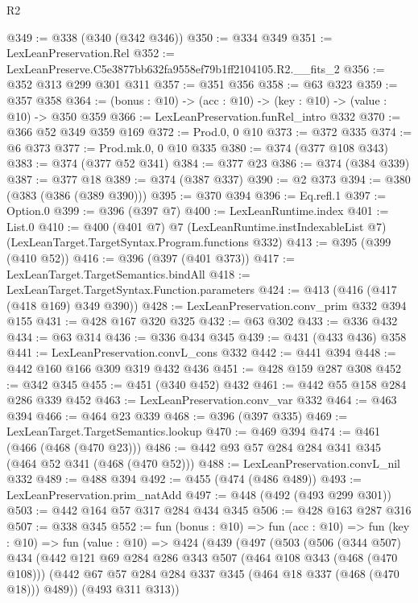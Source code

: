 \begin{lexlean}{R2}
\begin{coremodule}
@349 := @338 (@340 (@342 @346))
@350 := @334 @349
@351 := LexLeanPreservation.Rel
@352 := LexLeanPreserve.C5e3877bb632fa9558ef79b1ff2104105.R2.__fits_2
@356 := @352 @313 @299 @301 @311
@357 := @351 @356
@358 := @63 @323
@359 := @357 @358
@364 := (bonus : @10) -> (acc : @10) -> (key : @10) -> (value : @10) -> @350 @359
@366 := LexLeanPreservation.funRel_intro @332
@370 := @366 @52 @349 @359 @169
@372 := Prod.{0, 0} @10
@373 := @372 @335
@374 := @6 @373
@377 := Prod.mk.{0, 0} @10 @335
@380 := @374 (@377 @108 @343)
@383 := @374 (@377 @52 @341)
@384 := @377 @23
@386 := @374 (@384 @339)
@387 := @377 @18
@389 := @374 (@387 @337)
@390 := @2 @373
@394 := @380 (@383 (@386 (@389 @390)))
@395 := @370 @394
@396 := Eq.refl.{1}
@397 := Option.{0}
@399 := @396 (@397 @7)
@400 := LexLeanRuntime.index
@401 := List.{0}
@410 := @400
    (@401 @7)
    @7
    (LexLeanRuntime.instIndexableList @7)
    (LexLeanTarget.TargetSyntax.Program.functions @332)
@413 := @395 (@399 (@410 @52))
@416 := @396 (@397 (@401 @373))
@417 := LexLeanTarget.TargetSemantics.bindAll
@418 := LexLeanTarget.TargetSyntax.Function.parameters
@424 := @413 (@416 (@417 (@418 @169) @349 @390))
@428 := LexLeanPreservation.conv_prim @332 @394 @155
@431 := @428 @167 @320 @325
@432 := @63 @302
@433 := @336 @432
@434 := @63 @314
@436 := @336 @434 @345
@439 := @431 (@433 @436) @358
@441 := LexLeanPreservation.convL_cons @332
@442 := @441 @394
@448 := @442 @160 @166 @309 @319 @432 @436
@451 := @428 @159 @287 @308
@452 := @342 @345
@455 := @451 (@340 @452) @432
@461 := @442 @55 @158 @284 @286 @339 @452
@463 := LexLeanPreservation.conv_var @332
@464 := @463 @394
@466 := @464 @23 @339
@468 := @396 (@397 @335)
@469 := LexLeanTarget.TargetSemantics.lookup
@470 := @469 @394
@474 := @461 (@466 (@468 (@470 @23)))
@486 := @442 @93 @57 @284 @284 @341 @345 (@464 @52 @341 (@468 (@470 @52)))
@488 := LexLeanPreservation.convL_nil @332
@489 := @488 @394
@492 := @455 (@474 (@486 @489))
@493 := LexLeanPreservation.prim_natAdd
@497 := @448 (@492 (@493 @299 @301))
@503 := @442 @164 @57 @317 @284 @434 @345
@506 := @428 @163 @287 @316
@507 := @338 @345
@552 := fun (bonus : @10) =>
  fun (acc : @10) =>
  fun (key : @10) =>
  fun (value : @10) =>
  @424
    (@439
      (@497
        (@503
          (@506
            (@344 @507)
            @434
            (@442
              @121
              @69
              @284
              @286
              @343
              @507
              (@464 @108 @343 (@468 (@470 @108)))
              (@442 @67 @57 @284 @284 @337 @345 (@464 @18 @337 (@468 (@470 @18))) @489))
            (@493 @311 @313))

\end{coremodule}
\end{lexlean}
